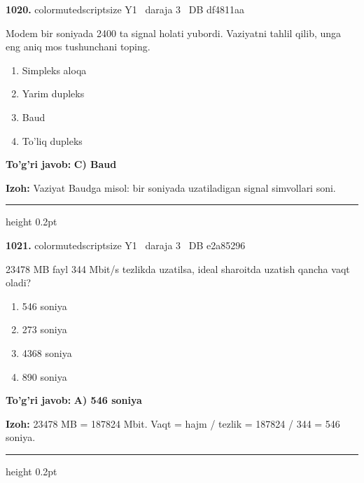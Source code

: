 \documentclass[10pt,a4paper,oneside]{article}
\begin{document}
\noindent\textbf{\color{ink}1020.}  {color{muted}scriptsize Y1 \textbullet\ daraja 3 \textbullet\ DB df4811aa}
\par
Modem bir soniyada 2400 ta signal holati yubordi. Vaziyatni tahlil qilib, unga eng aniq mos tushunchani toping.
\begin{enumerate}[label=\Alph*),leftmargin=9mm]
\item Simpleks aloqa
\item Yarim dupleks
\item Baud
\item To'liq dupleks
\end{enumerate}
\begin{tcolorbox}[enhanced,breakable,colback=teal!4,colframe=teal!50!black,boxrule=0.5pt,arc=1.1mm,left=3mm,right=3mm,top=1.7mm,bottom=1.7mm,before skip=2mm,after skip=2mm]
\textbf{\color{teal}To'g'ri javob:} \textbf{C) Baud}
\par\smallskip
\textbf{Izoh:} Vaziyat Baudga misol: bir soniyada uzatiladigan signal simvollari soni.
\end{tcolorbox}
\vspace{2mm}\hrule height 0.2pt \vspace{3mm}

\noindent\textbf{\color{ink}1021.}  {color{muted}scriptsize Y1 \textbullet\ daraja 3 \textbullet\ DB e2a85296}
\par
23478 MB fayl 344 Mbit/s tezlikda uzatilsa, ideal sharoitda uzatish qancha vaqt oladi?
\begin{enumerate}[label=\Alph*),leftmargin=9mm]
\item 546 soniya
\item 273 soniya
\item 4368 soniya
\item 890 soniya
\end{enumerate}
\begin{tcolorbox}[enhanced,breakable,colback=teal!4,colframe=teal!50!black,boxrule=0.5pt,arc=1.1mm,left=3mm,right=3mm,top=1.7mm,bottom=1.7mm,before skip=2mm,after skip=2mm]
\textbf{\color{teal}To'g'ri javob:} \textbf{A) 546 soniya}
\par\smallskip
\textbf{Izoh:} 23478 MB = 187824 Mbit. Vaqt = hajm / tezlik = 187824 / 344 = 546 soniya.
\end{tcolorbox}
\vspace{2mm}\hrule height 0.2pt \vspace{3mm}
\end{document}
